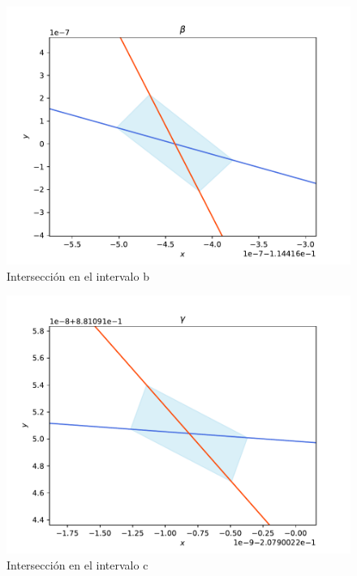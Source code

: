 \begin{figure}[H]
\centering
\includegraphics[scale=0.4]{cruce_b}
\caption{Intersección en el intervalo b}
\label{jung_corte2}
\end{figure}


\begin{figure}[H]
\centering
\includegraphics[scale=0.4]{cruce_c}
\caption{Intersección en el intervalo c}
\label{jung_corte3}
\end{figure}



